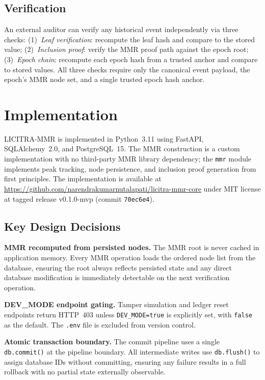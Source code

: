 \documentclass{article}
\begin{document}
\subsection{Verification}

An external auditor can verify any historical event independently via three
checks: (1)~\textit{Leaf verification}: recompute the leaf hash and compare to
the stored value; (2)~\textit{Inclusion proof}: verify the MMR proof path
against the epoch root; (3)~\textit{Epoch chain}: recompute each epoch hash from
a trusted anchor and compare to stored values. All three checks require only the
canonical event payload, the epoch's MMR node set, and a single trusted epoch
hash anchor.

\section{Implementation}

LICITRA-MMR is implemented in Python~3.11 using FastAPI, SQLAlchemy~2.0, and
PostgreSQL~15. The MMR construction is a custom implementation with no
third-party MMR library dependency; the \texttt{mmr} module implements peak
tracking, node persistence, and inclusion proof generation from first principles.
The implementation is available at
\url{https://github.com/narendrakumarnutalapati/licitra-mmr-core} under MIT
license at tagged release v0.1.0-mvp (commit \texttt{70ec6e4}).

\subsection{Key Design Decisions}

\textbf{MMR recomputed from persisted nodes.} The MMR root is never cached in
application memory. Every MMR operation loads the ordered node list from the
database, ensuring the root always reflects persisted state and any direct
database modification is immediately detectable on the next verification
operation.

\textbf{DEV\_MODE endpoint gating.} Tamper simulation and ledger reset endpoints
return HTTP~403 unless \texttt{DEV\_MODE=true} is explicitly set, with
\texttt{false} as the default. The \texttt{.env} file is excluded from version
control.

\textbf{Atomic transaction boundary.} The commit pipeline uses a single
\texttt{db.commit()} at the pipeline boundary. All intermediate writes use
\texttt{db.flush()} to assign database IDs without committing, ensuring any
failure results in a full rollback with no partial state externally observable.
\end{document}
